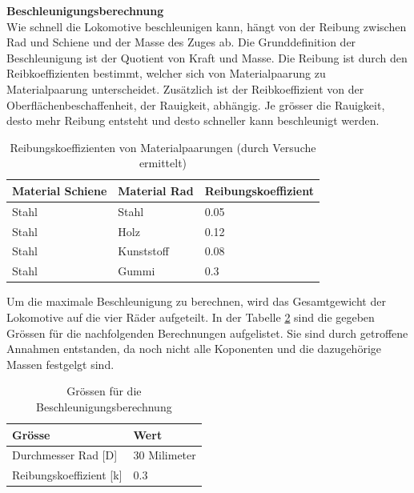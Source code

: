 \documentclass[../../main.tex]{subfiles}
\begin{document}
    \pagebreak

    \textbf{Beschleunigungsberechnung}\\
    Wie schnell die Lokomotive beschleunigen kann, hängt von der Reibung zwischen Rad und Schiene und der Masse des Zuges ab. Die Grunddefinition der Beschleunigung ist der Quotient von Kraft und Masse. Die Reibung ist durch den Reibkoeffizienten bestimmt, welcher sich von Materialpaarung zu Materialpaarung unterscheidet. Zusätzlich ist der Reibkoeffizient von der Oberflächenbeschaffenheit, der Rauigkeit, abhängig. Je grösser die Rauigkeit, desto mehr Reibung entsteht und desto schneller kann beschleunigt werden.

    \begin{table}[H] \centering
        \begin{tabular}{|l|l|l|}
        \hline
        \textbf{Material Schiene} & \textbf{Material Rad} & \textbf{Reibungskoeffizient}\\
        \hline
        Stahl                                & Stahl        & 0.05\\
        \hline
        Stahl                                & Holz         & 0.12\\
        \hline
        Stahl                                & Kunststoff   & 0.08\\
        \hline
        Stahl                                & Gummi        & 0.3\\
        \hline
        \end{tabular}

        \caption{Reibungskoeffizienten von Materialpaarungen (durch Versuche ermittelt)}
        \label{tab:com_tiny_pi}
        \end{table}

    Um die maximale Beschleunigung zu berechnen, wird das Gesamtgewicht der Lokomotive auf die vier Räder aufgeteilt. In der Tabelle \ref{tab:groessen_beschleunigung} sind die gegeben Grössen für die nachfolgenden Berechnungen aufgelistet. Sie sind durch getroffene Annahmen entstanden, da noch nicht alle Koponenten und die dazugehörige Massen festgelgt sind.\\

    \begin{table}[H] \centering
        \begin{tabular}{|l|l|}
        \hline
        \textbf{Grösse} & \textbf{Wert}\\
        \hline
        Durchmesser Rad [D]          & 30 Milimeter\\
         \hline
        Reibungskoeffizient [k]      & 0.3\\
        \hline
        \end{tabular}

        \caption{Grössen für die Beschleunigungsberechnung}
        \label{tab:groessen_beschleunigung}
        \end{table}
\end{document}
